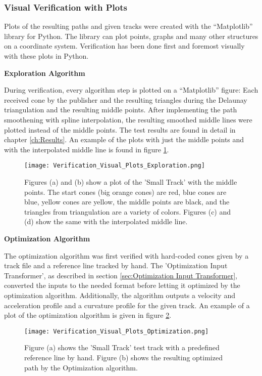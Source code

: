 \subsubsection{Visual Verification with Plots} \label{sec:Visual Verification with Plots}
Plots of the resulting paths and given tracks were created with the ``Matplotlib'' library for Python. The library can plot points, graphs and many other structures on a coordinate system. Verification has been done first and foremost visually with these plots in Python.

\textbf{Exploration Algorithm}

During verification, every algorithm step is plotted on a ``Matplotlib'' figure: Each received cone by the publisher and the resulting triangles during the Delaunay triangulation and the resulting middle points. After implementing the path smoothening with spline interpolation, the resulting smoothed middle lines were plotted instead of the middle points. The test results are found in detail in chapter \ref{ch:Results}. An example of the plots with just the middle points and with the interpolated middle line is found in figure \ref{fig:Verification Visual Plots Exploration}.

\begin{figure}[H]
    \centering
    \texttt{[image: Verification\_Visual\_Plots\_Exploration.png]}
    \caption{Figures (a) and (b) show a plot of the 'Small Track' with the middle points. The start cones (big orange cones) are red, blue cones are blue, yellow cones are yellow, the middle points are black, and the triangles from triangulation are a variety of colors. Figures (c) and (d) show the same with the interpolated middle line.}
    \label{fig:Verification Visual Plots Exploration}
\end{figure}

\textbf{Optimization Algorithm}

The optimization algorithm was first verified with hard-coded cones given by a track file and a reference line tracked by hand. The 'Optimization Input Transformer', as described in section \ref{sec:Optimization Input Transformer}, converted the inputs to the needed format before letting it optimized by the optimization algorithm. Additionally, the algorithm outputs a velocity and acceleration profile and a curvature profile for the given track. An example of a plot of the optimization algorithm is given in figure \ref{fig:Verification Visual Plots Optimization}.

\begin{figure}[H]
    \centering
    \texttt{[image: Verification\_Visual\_Plots\_Optimization.png]}
    \caption{Figure (a) shows the 'Small Track' test track with a predefined reference line by hand. Figure (b) shows the resulting optimized path by the Optimization algorithm.}
    \label{fig:Verification Visual Plots Optimization}
\end{figure}

